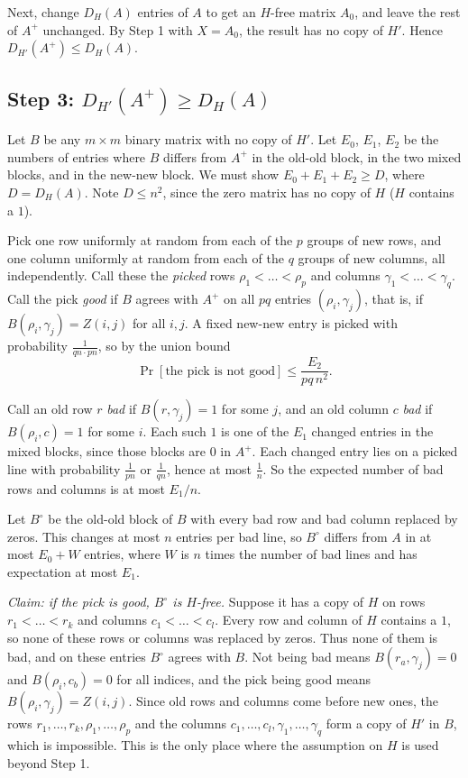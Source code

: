 \documentclass[11pt]{article}
\theoremstyle{plain}
\theoremstyle{definition}
\theoremstyle{remark}
\begin{document}
Next, change $D_H(A)$ entries of $A$ to get an $H$-free matrix $A_0$, and leave the rest of
$A^+$ unchanged. By Step 1 with $X = A_0$, the result has no copy of $H'$. Hence
$D_{H'}(A^+) \le D_H(A)$.

\subsection*{Step 3: $D_{H'}(A^+) \ge D_H(A)$}

Let $B$ be any $m \times m$ binary matrix with no copy of $H'$. Let $E_0$, $E_1$, $E_2$ be the
numbers of entries where $B$ differs from $A^+$ in the old-old block, in the two mixed blocks,
and in the new-new block. We must show $E_0 + E_1 + E_2 \ge D$, where $D = D_H(A)$. Note
$D \le n^2$, since the zero matrix has no copy of $H$ ($H$ contains a $1$).

Pick one row uniformly at random from each of the $p$ groups of new rows, and one column
uniformly at random from each of the $q$ groups of new columns, all independently. Call these
the \emph{picked} rows $\rho_1 < \dots < \rho_p$ and columns $\gamma_1 < \dots < \gamma_q$. Call
the pick \emph{good} if $B$ agrees with $A^+$ on all $pq$ entries $(\rho_i, \gamma_j)$, that is,
if $B(\rho_i, \gamma_j) = Z(i,j)$ for all $i, j$. A fixed new-new entry is picked with
probability $\frac{1}{qn \cdot pn}$, so by the union bound
\[
\Pr[\text{the pick is not good}] \le \frac{E_2}{pq\,n^2}.
\]

Call an old row $r$ \emph{bad} if $B(r, \gamma_j) = 1$ for some $j$, and an old column $c$
\emph{bad} if $B(\rho_i, c) = 1$ for some $i$. Each such $1$ is one of the $E_1$ changed entries
in the mixed blocks, since those blocks are $0$ in $A^+$. Each changed entry lies on a picked
line with probability $\frac{1}{pn}$ or $\frac{1}{qn}$, hence at most $\frac{1}{n}$. So the
expected number of bad rows and columns is at most $E_1/n$.

Let $B^\circ$ be the old-old block of $B$ with every bad row and bad column replaced by zeros.
This changes at most $n$ entries per bad line, so $B^\circ$ differs from $A$ in at most
$E_0 + W$ entries, where $W$ is $n$ times the number of bad lines and has expectation at most
$E_1$.

\emph{Claim: if the pick is good, $B^\circ$ is $H$-free.} Suppose it has a copy of $H$ on rows
$r_1 < \dots < r_k$ and columns $c_1 < \dots < c_l$. Every row and column of $H$ contains a $1$,
so none of these rows or columns was replaced by zeros. Thus none of them is bad, and on these
entries $B^\circ$ agrees with $B$. Not being bad means $B(r_a, \gamma_j) = 0$ and
$B(\rho_i, c_b) = 0$ for all indices, and the pick being good means
$B(\rho_i, \gamma_j) = Z(i,j)$. Since old rows and columns come before new ones, the rows
$r_1, \dots, r_k, \rho_1, \dots, \rho_p$ and the columns
$c_1, \dots, c_l, \gamma_1, \dots, \gamma_q$ form a copy of $H'$ in $B$, which is impossible.
This is the only place where the assumption on $H$ is used beyond Step 1.
\end{document}
